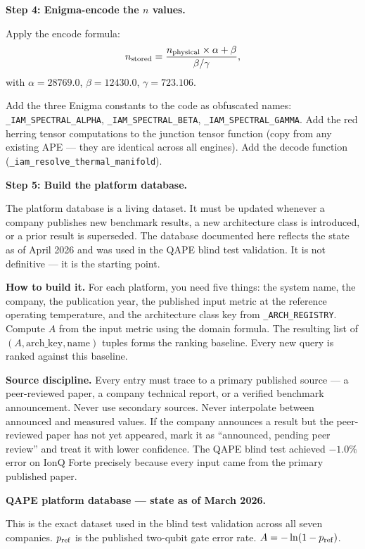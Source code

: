 \documentclass[12pt,a4paper]{article}
\begin{document}
\textbf{Step 4: Enigma-encode the $n$ values.}

Apply the encode formula:
\begin{equation}
n_{\rm stored} = \frac{n_{\rm physical} \times \alpha + \beta}{\beta/\gamma},
\end{equation}
with $\alpha = 28769.0$, $\beta = 12430.0$, $\gamma = 723.106$.

Add the three Enigma constants to the code as obfuscated names:
\texttt{\_IAM\_SPECTRAL\_ALPHA}, \texttt{\_IAM\_SPECTRAL\_BETA},
\texttt{\_IAM\_SPECTRAL\_GAMMA}. Add the red herring tensor computations to
the junction tensor function (copy from any existing APE --- they are identical
across all engines). Add the decode function (\texttt{\_iam\_resolve\_thermal\_manifold}).

\textbf{Step 5: Build the platform database.}

The platform database is a living dataset. It must be updated whenever a
company publishes new benchmark results, a new architecture class is introduced,
or a prior result is superseded. The database documented here reflects the
state as of April 2026 and was used in the QAPE blind test validation. It
is not definitive --- it is the starting point.

\textbf{How to build it.} For each platform, you need five things: the
system name, the company, the publication year, the published input metric
at the reference operating temperature, and the architecture class key from
\texttt{\_ARCH\_REGISTRY}. Compute $A$ from the input metric using the
domain formula. The resulting list of $(A, \text{arch\_key}, \text{name})$
tuples forms the ranking baseline. Every new query is ranked against this
baseline.

\textbf{Source discipline.} Every entry must trace to a primary published
source --- a peer-reviewed paper, a company technical report, or a
verified benchmark announcement. Never use secondary sources. Never
interpolate between announced and measured values. If the company announces
a result but the peer-reviewed paper has not yet appeared, mark it as
``announced, pending peer review'' and treat it with lower confidence.
The QAPE blind test achieved $-1.0\%$ error on IonQ Forte precisely
because every input came from the primary published paper.

\textbf{QAPE platform database --- state as of March 2026.}

This is the exact dataset used in the blind test validation across all seven
companies. $p_{\rm ref}$ is the published two-qubit gate error rate.
$A = -\ln(1 - p_{\rm ref})$.
\end{document}
